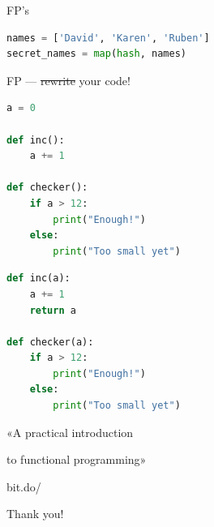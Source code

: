 \documentclass[aspectratio=169]{beamer}
\newcommand{\soutthick}[1]{%
    \renewcommand{\ULthickness}{2.4pt}%
       \sout{#1}%
    \renewcommand{\ULthickness}{.4pt}%
}
\begin{document}
\begin{frame}[fragile,t]
    \vspace{0.8em}
    \Huge{FP's }

    \begin{lstlisting}[language=Python]
names = ['David', 'Karen', 'Ruben']
secret_names = map(hash, names)
    \end{lstlisting}
\end{frame}

\begin{frame}
    \HUGE
        \hspace{2.35em}\newline
        FP --- \soutthick{rewrite} your code!
\end{frame}

\begin{frame}[fragile,t]
    \begin{lstlisting}[language=Python]
a = 0

def inc():
    a += 1

def checker():
    if a > 12:
        print("Enough!")
    else:
        print("Too small yet")
    \end{lstlisting}
\end{frame}

\begin{frame}[fragile,t]
    \begin{lstlisting}[language=Python]
def inc(a):
    a += 1
    return a

def checker(a):
    if a > 12:
        print("Enough!")
    else:
        print("Too small yet")
    \end{lstlisting}
\end{frame}






\begin{frame}
    \centering
\end{frame}

\begin{frame}
    \Huge{«A practical introduction}

    \Huge{\hspace{0.59em}to functional programming»}

    \vspace{1em}

    \Huge{bit.do/}
\end{frame}

\begin{frame}
    \centering
        \Huge{Thank you!}

\end{frame}
\end{document}
